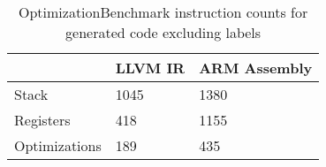 \begin{table}[h!]
\centering
\begin{tabular}{p{}p{}p{}}
  \hline
 & LLVM IR & ARM Assembly \\ 
  \hline
Stack & 1045 & 1380 \\ 
  Registers & 418 & 1155 \\ 
  Optimizations & 189 & 435 \\ 
   \hline
\end{tabular}
\caption{OptimizationBenchmark instruction counts for generated code excluding labels}
\end{table}
